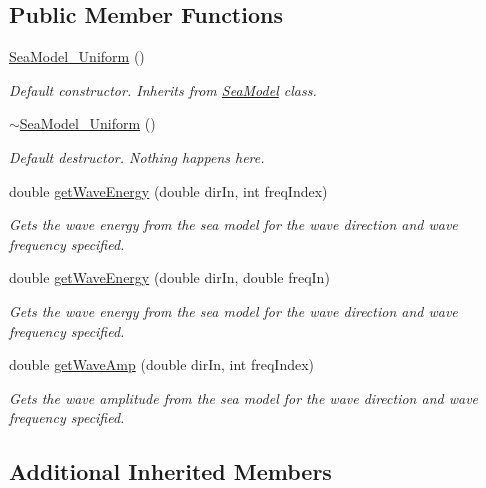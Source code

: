 \subsection*{Public Member Functions}
\begin{DoxyCompactItemize}
\item 
\hyperlink{classosea_1_1_sea_model___uniform_a4f97340193390d1f815d1aff94b83f94}{Sea\-Model\-\_\-\-Uniform} ()
\begin{DoxyCompactList}\small\item\em Default constructor. Inherits from \hyperlink{classosea_1_1_sea_model}{Sea\-Model} class. \end{DoxyCompactList}\item 
\hyperlink{classosea_1_1_sea_model___uniform_a419b48ecdac425cfe182768f7aed9ff6}{$\sim$\-Sea\-Model\-\_\-\-Uniform} ()
\begin{DoxyCompactList}\small\item\em Default destructor. Nothing happens here. \end{DoxyCompactList}\item 
double \hyperlink{classosea_1_1_sea_model___uniform_aedd2e3bd519a79c6f05027dcadb6259d}{get\-Wave\-Energy} (double dir\-In, int freq\-Index)
\begin{DoxyCompactList}\small\item\em Gets the wave energy from the sea model for the wave direction and wave frequency specified. \end{DoxyCompactList}\item 
double \hyperlink{classosea_1_1_sea_model___uniform_af8db8287e12f25665405bc3fcf93c01e}{get\-Wave\-Energy} (double dir\-In, double freq\-In)
\begin{DoxyCompactList}\small\item\em Gets the wave energy from the sea model for the wave direction and wave frequency specified. \end{DoxyCompactList}\item 
double \hyperlink{classosea_1_1_sea_model___uniform_a896518443a9328812737ee94d020d2f0}{get\-Wave\-Amp} (double dir\-In, int freq\-Index)
\begin{DoxyCompactList}\small\item\em Gets the wave amplitude from the sea model for the wave direction and wave frequency specified. \end{DoxyCompactList}\end{DoxyCompactItemize}
\subsection*{Additional Inherited Members}


